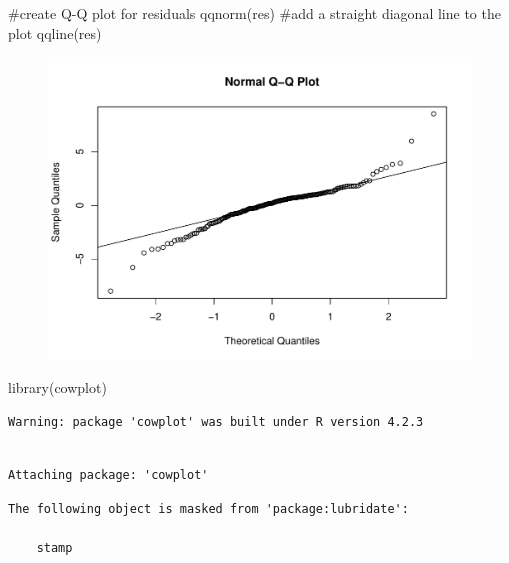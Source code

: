 \documentclass[
  letterpaper,
  DIV=11,
  numbers=noendperiod]{scrartcl}
\newenvironment{Shaded}{\begin{snugshade}}{\end{snugshade}}
\newcommand{\CommentTok}[1]{\textcolor[rgb]{0.37,0.37,0.37}{#1}}
\newcommand{\FunctionTok}[1]{\textcolor[rgb]{0.28,0.35,0.67}{#1}}
\newcommand{\NormalTok}[1]{\textcolor[rgb]{0.00,0.23,0.31}{#1}}
\begin{document}
\begin{Shaded}
\begin{Highlighting}[]
\CommentTok{\#create Q{-}Q plot for residuals}
\FunctionTok{qqnorm}\NormalTok{(res)}
\CommentTok{\#add a straight diagonal line to the plot}
\FunctionTok{qqline}\NormalTok{(res)}
\end{Highlighting}
\end{Shaded}

\begin{figure}[H]

{\centering \includegraphics{THP_CEAC_20231102_files/figure-pdf/data_plot_stat_rh-3.pdf}

}

\end{figure}

\begin{Shaded}
\begin{Highlighting}[]
\FunctionTok{library}\NormalTok{(cowplot)}
\end{Highlighting}
\end{Shaded}

\begin{verbatim}
Warning: package 'cowplot' was built under R version 4.2.3
\end{verbatim}

\begin{verbatim}

Attaching package: 'cowplot'
\end{verbatim}

\begin{verbatim}
The following object is masked from 'package:lubridate':

    stamp
\end{verbatim}
\end{document}
